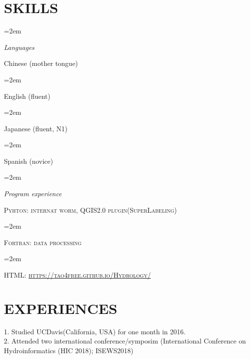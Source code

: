 \documentclass[paper=a4,fontsize=11pt]{scrartcl} %
\newlength{\spacebox}
\newcommand{\NewPart}[1]{\section*{\uppercase{#1}}}
\newcommand{\PersonalEntry}[2]{
		\noindent\hangindent=2em\hangafter=0 %
		\parbox{\spacebox}{        %
		\textit{#1}}		       %
		\hspace{1.5em} #2 \par}    %
\newcommand{\SkillsEntry}[2]{      %
		\noindent\hangindent=2em\hangafter=0 %
		\parbox{\spacebox}{        %
		\textit{#1}}			   %
		\hspace{1.5em} #2 \par}    %
\begin{document}
\NewPart{Skills}{}

\SkillsEntry{Languages}{Chinese (mother tongue)}
\SkillsEntry{}{English (fluent)}
\SkillsEntry{}{Japanese (fluent, N1)}
\SkillsEntry{}{Spanish (novice)}

\SkillsEntry{Program experience}{\textsc{Pyhton: internat worm, QGIS2.0 plugin(SuperLabeling)}}
\SkillsEntry{}{\textsc{Fortran: data processing}}
\SkillsEntry{}{\textsc{HTML: \url {https://tao4free.github.io/Hydrology/}}}


\NewPart{Experiences}{}
1. Studied UCDavis(California, USA) for one month in 2016.\\
2. Attended two international conference/symposim (International Conference on Hydroinformatics (HIC 2018); ISEWS2018)
\end{document}
